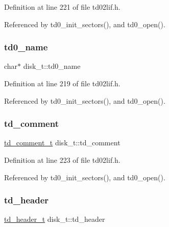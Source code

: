 Definition at line 221 of file td02lif.\+h.



Referenced by td0\+\_\+init\+\_\+sectors(), and td0\+\_\+open().

\mbox{\label{structdisk__t_a8be70c86aaffb22bab0e0969630a7062}} 
\subsubsection{\texorpdfstring{td0\+\_\+name}{td0\_name}}
{\footnotesize\ttfamily char$\ast$ disk\+\_\+t\+::td0\+\_\+name}



Definition at line 219 of file td02lif.\+h.



Referenced by td0\+\_\+init\+\_\+sectors(), and td0\+\_\+open().

\mbox{\label{structdisk__t_a7d84ffa6301a1e05b5a8a686d710bb8f}} 
\subsubsection{\texorpdfstring{td\+\_\+comment}{td\_comment}}
{\footnotesize\ttfamily \hyperlink{structtd__comment__t}{td\+\_\+comment\+\_\+t} disk\+\_\+t\+::td\+\_\+comment}



Definition at line 223 of file td02lif.\+h.



Referenced by td0\+\_\+init\+\_\+sectors(), and td0\+\_\+open().

\mbox{\label{structdisk__t_a83cf946593922db2bdedef21bb7b4aff}} 
\subsubsection{\texorpdfstring{td\+\_\+header}{td\_header}}
{\footnotesize\ttfamily \hyperlink{structtd__header__t}{td\+\_\+header\+\_\+t} disk\+\_\+t\+::td\+\_\+header}



